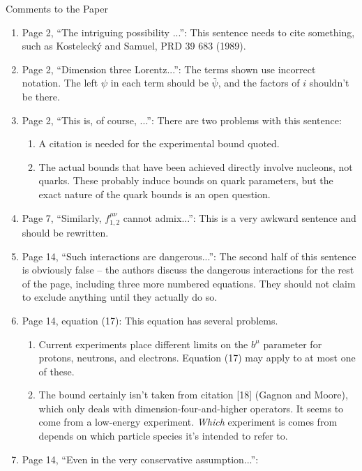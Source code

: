 \documentclass[12pt,preprintnumbers,nofootinbib]{revtex4}
\begin{document}
\begin{center}
\centering
\Large
Comments to the Paper
\end{center}


\begin{enumerate}
\item Page 2, ``The intriguing possibility ...'':
 This sentence needs to cite something,
 such as Kosteleck\'y and Samuel, PRD 39 683 (1989).
\item Page 2, ``Dimension three Lorentz...'':
 The terms shown use incorrect notation.
 The left $\psi$ in each term should be $\bar{\psi}$,
 and the factors of $i$ shouldn't be there.
\item Page 2, ``This is, of course, ...'':
 There are two problems with this sentence:
 \begin{enumerate}
 \item A citation is needed for the experimental bound quoted.
 \item The actual bounds that have been achieved directly involve nucleons, not
quarks.
 These probably induce bounds on quark parameters,
 but the exact nature of the quark bounds is an open question.
 \end{enumerate}
\item Page 7, ``Similarly, $f_{1,2}^{\mu\nu}$ cannot admix...'':
 This is a very awkward sentence and should be rewritten.
\item Page 14, ``Such interactions are dangerous...'':
 The second half of this sentence is obviously false --
 the authors discuss the dangerous interactions for the rest of the page,
 including three more numbered equations.
 They should not claim to exclude anything until they actually do so.
\item Page 14, equation (17):
 This equation has several problems.
 \begin{enumerate}
 \item Current experiments place different limits on the $b^\mu$ parameter
 for protons, neutrons, and electrons.
 Equation (17) may apply to at most one of these.
 \item The bound certainly isn't taken from citation [18] (Gagnon and Moore),
 which only deals with dimension-four-and-higher operators.
 It seems to come from a low-energy experiment.
 {\itshape Which} experiment is comes from depends on which particle species
 it's intended to refer to.
 \end{enumerate}
\item Page 14, ``Even in the very conservative assumption...'':

\end{enumerate}
\end{document}
